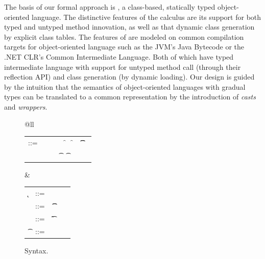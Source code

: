 \documentclass[acmsmall, anonymous, authordraft, review]{acmart} %
\begin{document}
\vspace{-2mm}

\noindent
The basis of our formal approach is \kafka, a class-based, statically typed
object-oriented language. The distinctive features of the calculus are its
support for both typed and untyped method innovation, as well as that
dynamic class generation by explicit class tables.  The features of \kafka
are modeled on common compilation targets for object-oriented language such
as the JVM's Java Bytecode or the .NET CLR's Common Intermediate
Language. Both of which have typed intermediate language with support for
untyped method call (through their reflection API) and class generation (by
dynamic loading).  Our design is guided by the intuition that the semantics
of object-oriented languages with gradual types can be translated to a
common representation by the introduction of \emph{casts} and
\emph{wrappers}.

\begin{figure}[!h]\hrulefill

\vspace{4mm}

\small\begin{tabular}{@{}ll}

\begin{minipage}{9cm}\begin{tabular}{@{}l@{~}l@{}l@{}l@{}l@{}l@{}l@{}l}
\e\hspace{.1cm} ::= & \hspace{.2cm} \x        
    &\B \this         
   &\B \that      
   &\B \FRead\f     
   &\B \FWrite\f\e   
   &\B \KCall\e\m\e\t\t \\
   & &
   &\B \SubCast\t\e 
   &\B \BehCast\t\e 
   &\B \New\C{\e[1]..}  
   &\B \DynCall\e\m\e 
\end{tabular}\end{minipage}&
\begin{minipage}{3.4cm}\begin{tabular}{l@{~}l@{}l@{}l}
  \k &::= \Class \C {\fd[1]..}{\md[1]..} \\
 \md &::= ~ \Mdef\m\x\t\t\e \\ 
 \fd &::= ~ \Fdef\f\t \\ 
  \t &::= ~ \any  \B   \C  \\ 
\end{tabular}\end{minipage} 
\end{tabular}

\vspace{4mm}

\noindent\hrulefill
\caption{\kafka Syntax.}\label{syn}
\end{figure}
\end{document}
